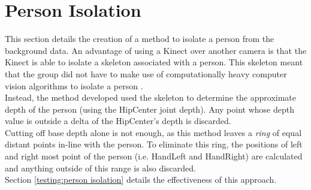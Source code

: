 \section{Person Isolation}
\label{design:person isolation}
This section details the creation of a method to isolate a person from the background data. An advantage of using a Kinect over another camera is that the Kinect is able to isolate a skeleton associated with a person. This skeleton meant that the group did not have to make use of computationally heavy computer vision algorithms to isolate a person .\\

Instead, the method developed used the skeleton to determine the approximate depth of the person (using the HipCenter joint depth). Any point whose depth value is outside a delta of the HipCenter's depth is discarded.\\ 

Cutting off base depth alone is not enough, as this method leaves a \textit{ring} of equal distant points in-line with the person. To eliminate this ring, the positions of left and right most point of the person (i.e. HandLeft and HandRight) are calculated and anything outside of this range is also discarded. \\

Section \ref{testing:person isolation} details the effectiveness of this approach.